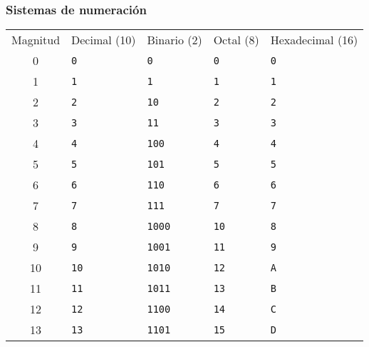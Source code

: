 \documentclass[aspectratio=169]{beamer}
\begin{document}
\begin{frame}[fragile]
    \frametitle{Sistemas de numeración}
    \begin{center}
    \scriptsize
    \begin{tabular}{c|R{2cm}|R{2cm}|R{2cm}|R{2cm}|}
    Magnitud   & Decimal (10) & Binario (2)  & Octal (8)  & Hexadecimal (16)  \\ 
    0          & \texttt{0}            & \texttt{0    }        & \texttt{0}          & \texttt{0}                 \\ 
    1          & \texttt{1}            & \texttt{1    }        & \texttt{1}          & \texttt{1}                 \\ 
    2          & \texttt{2}            & \textcolor{naranjauca}{\texttt{10   }}        & \texttt{2}          & \texttt{2}                 \\ 
    3          & \texttt{3}            & \texttt{11   }        & \texttt{3}          & \texttt{3}                 \\ 
    4          & \texttt{4}            & \texttt{100  }        & \texttt{4}          & \texttt{4}                 \\ 
    5          & \texttt{5}            & \texttt{101  }        & \texttt{5}          & \texttt{5}                 \\ 
    6          & \texttt{6}            & \texttt{110  }        & \texttt{6}          & \texttt{6}                 \\ 
    7          & \texttt{7}            & \texttt{111  }        & \texttt{7}          & \texttt{7}                 \\ 
    8          & \texttt{8}            & \texttt{1000 }        & \textcolor{naranjauca}{\texttt{10}}         & \texttt{8}                 \\ 
    9          & \texttt{9}            & \texttt{1001 }        & \texttt{11}         & \texttt{9}                 \\ 
    10         & \textcolor{naranjauca}{\texttt{10}}           & \texttt{1010 }        & \texttt{12}         & \texttt{A}                 \\ 
    11         & \texttt{11}           & \texttt{1011 }        & \texttt{13}         & \texttt{B}                 \\ 
    12         & \texttt{12}           & \texttt{1100 }        & \texttt{14}         & \texttt{C}                 \\ 
    13         & \texttt{13}           & \texttt{1101 }        & \texttt{15}         & \texttt{D}                 \\ 

\end{tabular}
\end{center}
\end{frame}
\end{document}
